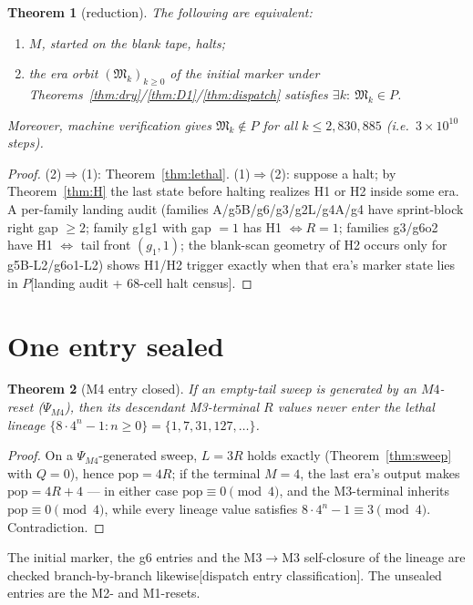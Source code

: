 \documentclass[11pt]{amsart}
\newtheorem{theorem}{Theorem}[section]
\begin{document}
\begin{theorem}[reduction]\label{thm:reduction}
The following are equivalent:
\begin{enumerate}
\item $M$, started on the blank tape, halts;
\item the era orbit $(\mathfrak M_k)_{k\ge0}$ of the initial marker under Theorems~\ref{thm:dry}/\ref{thm:D1}/\ref{thm:dispatch} satisfies $\exists k:\ \mathfrak M_k\in P$.
\end{enumerate}
Moreover, machine verification gives $\mathfrak M_k\notin P$ for all $k\le 2{,}830{,}885$ (i.e.\ $3\times10^{10}$ steps).
\end{theorem}
\begin{proof}
(2)$\Rightarrow$(1): Theorem~\ref{thm:lethal}. (1)$\Rightarrow$(2): suppose a halt; by Theorem~\ref{thm:H} the last state before halting realizes H1 or H2 inside some era. A per-family landing audit (families A/g5B/g6/g3/g2L/g4A/g4 have sprint-block right gap $\ge2$; family g1g1 with gap $=1$ has H1 $\iff R=1$; families g3/g6o2 have H1 $\iff$ tail front $(g_1,1)$; the blank-scan geometry of H2 occurs only for g5B-L2/g6o1-L2) shows H1/H2 trigger exactly when that era's marker state lies in $P$[landing audit + 68-cell halt census].
\end{proof}

\section{One entry sealed}

\begin{theorem}[M4 entry closed]\label{thm:m4}
If an empty-tail sweep is generated by an $M4$-reset ($\Psi_{M4}$), then its descendant M3-terminal $R$ values never enter the lethal lineage $\{8\cdot4^n-1:n\ge0\}=\{1,7,31,127,\dots\}$.
\end{theorem}
\begin{proof}
On a $\Psi_{M4}$-generated sweep, $L=3R$ holds exactly (Theorem~\ref{thm:sweep} with $Q=0$), hence $\mathrm{pop}=4R$; if the terminal $M=4$, the last era's output makes $\mathrm{pop}=4R{+}4$ --- in either case $\mathrm{pop}\equiv0\pmod4$, and the M3-terminal inherits $\mathrm{pop}\equiv0\pmod4$, while every lineage value satisfies $8\cdot4^n-1\equiv3\pmod4$. Contradiction.
\end{proof}

The initial marker, the g6 entries and the M3$\to$M3 self-closure of the lineage are checked branch-by-branch likewise[dispatch entry classification]. The unsealed entries are the M2- and M1-resets.
\end{document}
